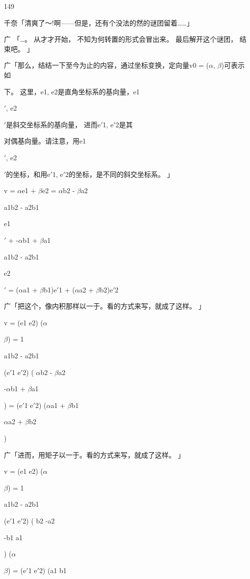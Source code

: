 149\par
千奈「清爽了～!啊——但是，还有个没法的然的谜团留着……」\par
广 「…。 从才才开始， 不知为何转置的形式会冒出来。 最后解开这个谜团， 结束吧。 」\par
广「那么，结结一下至今为止的内容，通过坐标变换，定向量v0 = ($\alpha$, $\beta$)可表示如\par
下。 这里，e1, e2是直角坐标系的基向量，e1\par
$\prime$, e2\par
$\prime$是斜交坐标系的基向量， 进而e$\prime$1, e$\prime$2是其\par
对偶基向量。请注意，用e1\par
$\prime$, e2\par
$\prime$的坐标，和用e$\prime$1, e$\prime$2的坐标，是不同的斜交坐标系。 」\par
v = $\alpha$e1 + $\beta$e2 = $\alpha$b2 - $\beta$a2\par
a1b2 - a2b1\par
e1\par
$\prime$ + -$\alpha$b1 + $\beta$a1\par
a1b2 - a2b1\par
e2\par
$\prime$ = ($\alpha$a1 + $\beta$b1)e$\prime$1 + ($\alpha$a2 + $\beta$b2)e$\prime$2\par
广「把这个，像内积那样以一于。看的方式来写，就成了这样。 」\par
v = (e1 e2) ($\alpha$\par
$\beta$) = 1\par
a1b2 - a2b1\par
(e$\prime$1 e$\prime$2) ( $\alpha$b2 - $\beta$a2\par
-$\alpha$b1 + $\beta$a1\par
) = (e$\prime$1 e$\prime$2) ($\alpha$a1 + $\beta$b1\par
$\alpha$a2 + $\beta$b2\par
)\par
广「进而，用矩子以一于。看的方式来写，就成了这样。 」\par
v = (e1 e2) ($\alpha$\par
$\beta$) = 1\par
a1b2 - a2b1\par
(e$\prime$1 e$\prime$2) ( b2 -a2\par
-b1 a1\par
) ($\alpha$\par
$\beta$) = (e$\prime$1 e$\prime$2) (a1 b1\par
